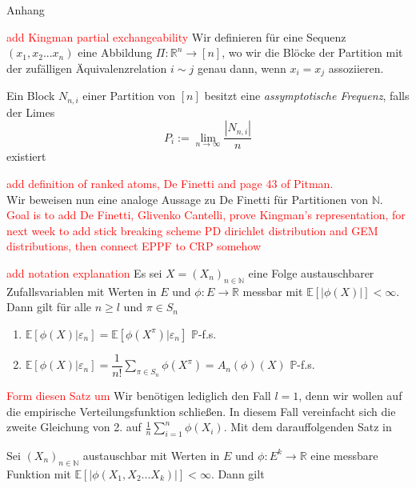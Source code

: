 \begin{section}{Anhang}
    
\textcolor{red}{add Kingman partial exchangeability}   
Wir definieren für eine Sequenz $(x_1,x_2...x_n)$ eine Abbildung $\Pi: \mathbb{R}^n \to [n]$, wo wir die Blöcke der Partition mit der zufälligen Äquivalenzrelation $i \sim j$ genau dann, wenn $x_i = x_j$ assoziieren.
\begin{Definition}
    Ein Block $N_{n,i}$ einer Partition von $[n]$ besitzt eine \textit{assymptotische Frequenz}, falls der Limes 
    \[
    P_i := \lim_{n \to \infty}\frac{|N_{n,i}|}{n}
    \] 
    existiert
\end{Definition}
\textcolor{red}{add definition of ranked atoms,  De Finetti and page 43 of Pitman.}
\\
Wir beweisen nun eine analoge Aussage zu De Finetti für Partitionen von $\mathbb{N}$.
\textcolor{red}{Goal is to add De Finetti, Glivenko Cantelli, prove Kingman's representation, for next week to add stick breaking scheme PD dirichlet distribution and GEM distributions, then connect EPPF to CRP somehow}
\begin{lemma}
    \cite[Lemma 8.11]{NeiningerHS}
    \label{exchangeable expectations}
    \textcolor{red}{add notation explanation}
    Es sei $X = (X_{n})_{n \in \mathbb{N}}$ eine Folge austauschbarer Zufallsvariablen mit Werten in $E$ und $\phi: E \to \mathbb{R}$ messbar mit $\mathbb{E}[|\phi(X)|]< \infty$. Dann gilt für alle $n \geq l$ und $\pi \in S_n$
    \begin{enumerate}
        \item $ \mathbb{E}[\phi(X)|\varepsilon_n] =\mathbb{E}[\phi(X^\pi)|\varepsilon_n]  $  $\mathbb{P}$-f.s.
        \item $ \mathbb{E}[\phi(X)|\varepsilon_n] = \dfrac{1}{n!}\sum_{\pi \in S_n} \phi(X^\pi) = A_n(\phi)(X)$ $\mathbb{P}$-f.s.
    \end{enumerate}
\end{lemma}
\textcolor{red}{Form diesen Satz um} Wir benötigen lediglich den Fall $l = 1$, denn wir wollen auf die empirische Verteilungsfunktion schließen. In diesem Fall vereinfacht sich die zweite Gleichung von 2. auf $\frac{1}{n}\sum_{i=1}^{n}\phi(X_i)$. Mit dem darauffolgenden Satz in \cite{NeiningerHS}
\begin{theorem}
\label{exchangeable law of large numbers}
\cite[Satz 8.12]{NeiningerHS}
Sei $(X_n)_{n \in \mathbb{N}}$ austauschbar mit Werten in $E$ und $\phi: E^k \to \mathbb{R}$ eine messbare Funktion mit $\mathbb{E}[|\phi(X_1,X_2 ... X_k)|] < \infty$. Dann gilt

\end{theorem}
\end{section}
